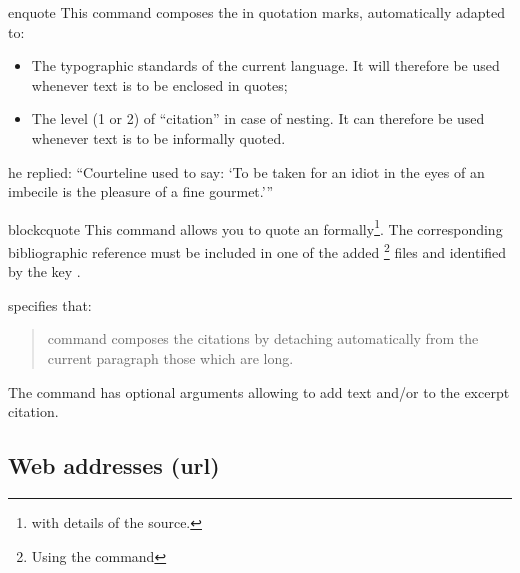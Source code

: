 \documentclass[english,nolocaltoc]{nwejmart}
\newtheorem[style=definition]{fact}
\newtheorem[title=experience]{experience}
\newtheorem[title-plural=rings]{ring}
\newtheorem[title=ideal,title-plural=ideals]{ideal}
\begin{document}
\begin{docCommand}{enquote}{}
  This command composes the  in quotation marks, automatically
  adapted to:
  \begin{itemize}
  \item The typographic standards of the current language. It will
    therefore be used whenever text is to be enclosed in quotes;
  \item The level  (1 or 2) of \enquote{citation} in case of
    nesting. It can therefore be used whenever text is to be
    informally quoted.
  \end{itemize}
\begin{bodycode}[listing and text,listing
  options={alsolanguage={[csquotes]TeX}}]
he replied: \enquote{Courteline used to say: \enquote{To be taken for
    an idiot in the eyes of an imbecile is the pleasure of a fine gourmet.}}
\end{bodycode}
\end{docCommand}

\begin{docCommand}{blockcquote}{}
  This command allows you to quote an 
  formally\footnote{\Ie*{} with details of the  source.}. The
  corresponding bibliographic reference must be included in one of the
   added \footnote{Using the   command}   files
  and identified by the key .

\renewcommand{\thempfootnote}{\arabic{mpfootnote}}
\begin{bodycode}[listing and text,listing options={alsolanguage={[biblatex]TeX},alsolanguage={[csquotes]TeX},deletekeywords={[3]footnote}}]
\citeauthor{Bitouze} specifies that:
\blockcquote{Bitouze}{%
   command composes the citations by detaching 
  automatically from the current paragraph those which are
  long.%
}.
\end{bodycode}
\renewcommand{\thempfootnote}{\alph{mpfootnote}}
\end{docCommand}

The  command has optional arguments allowing to
add text  and/or  to the excerpt
citation\autocite[For more details, see for instance][]{Bitouze}.


\subsection{Web addresses (\texorpdfstring{\acrshort{url}}{URL})}
\label{sec-url}
\end{document}
